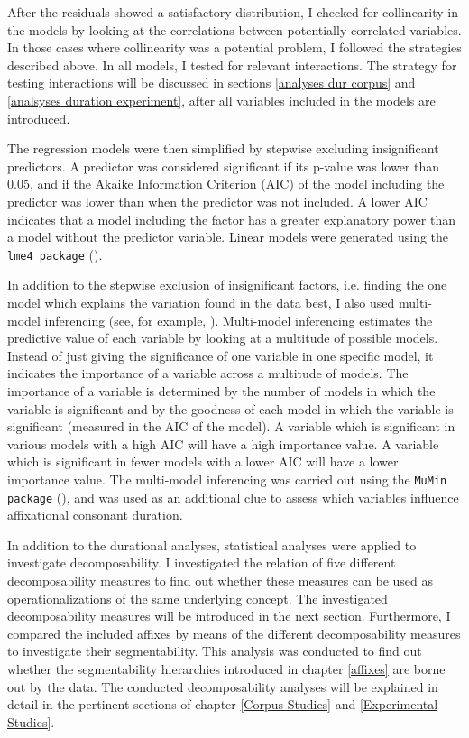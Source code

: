 After the residuals showed a satisfactory distribution, I checked for collinearity in the models by looking at the correlations between potentially correlated variables. In those cases where collinearity was a potential problem, I followed the strategies described above.  In all models, I tested for relevant interactions. The strategy for testing interactions will be discussed in sections \ref{analyses dur corpus} and \ref{analsyses duration experiment}, after all variables included in the models are introduced.

The regression models were then simplified by stepwise excluding insignificant predictors. A predictor was considered significant if its p-value was lower than 0.05, and if the Akaike Information Criterion (AIC) of the model including the predictor was lower than when the predictor was not included. A lower AIC indicates that a model including the factor has a greater explanatory power than a model without the predictor variable. Linear models were generated using the \texttt{lme4 package} (\citealt{Bates.2014}).

In addition to the stepwise exclusion of insignificant factors, i.e. finding the one model which explains the variation found in the data best, I also used multi-model inferencing (see, for example, \citealt{Barth.2014}). Multi-model inferencing estimates the predictive value of each variable by looking at a multitude of possible models. Instead of just giving the significance of one variable in one specific model, it indicates the importance of a variable across a multitude of models. 
The importance of a variable is determined by the number of models in which the variable is significant and by the goodness of each model in which the variable is significant (measured in the AIC of the model). A variable which is significant in various models with a high AIC will have a high importance value. A variable which is significant in fewer models with a lower AIC will have a lower importance value. The multi-model inferencing was carried out using the \texttt{MuMin package} (\citealt{Barton.2016}), and was used as an additional clue to assess which variables influence affixational consonant duration.

In addition to the durational analyses, statistical analyses were applied to investigate decomposability. 
I investigated the relation of five different decomposability measures to find out whether these measures can be used as operationalizations of the same underlying concept. The investigated decomposability measures will be introduced in the next section. 
Furthermore, I compared the included affixes by means of the different decomposability measures to investigate their segmentability. This analysis was conducted to find out whether the segmentability hierarchies introduced in chapter \ref{affixes} are borne out by the data. 
The conducted decomposability analyses will be explained in detail in the pertinent sections of chapter \ref{Corpus Studies} and \ref{Experimental Studies}. 



